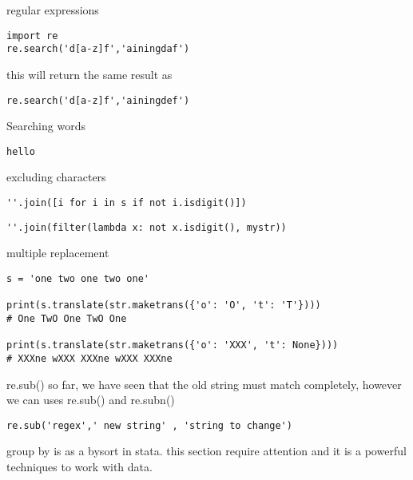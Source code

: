 \documentclass{beamer}
\begin{document}
\begin{frame}[fragile]{regular expressions}
\begin{lstlisting}
import re
re.search('d[a-z]f','ainingdaf')
\end{lstlisting}
this will return the same result as 
\begin{lstlisting}
re.search('d[a-z]f','ainingdef')
\end{lstlisting}
\end{frame}

\begin{frame}[fragile]{Searching words}
\begin{lstlisting}
hello
\end{lstlisting}
\end{frame}


\begin{frame}[fragile]{excluding characters}
\begin{lstlisting}
''.join([i for i in s if not i.isdigit()])
\end{lstlisting}

\begin{lstlisting}
''.join(filter(lambda x: not x.isdigit(), mystr))
\end{lstlisting}

\end{frame}


\begin{frame}[fragile]{multiple replacement}
\begin{lstlisting}
s = 'one two one two one'

print(s.translate(str.maketrans({'o': 'O', 't': 'T'})))
# One TwO One TwO One

print(s.translate(str.maketrans({'o': 'XXX', 't': None})))
# XXXne wXXX XXXne wXXX XXXne
\end{lstlisting}
\end{frame}



\begin{frame}[fragile]{re.sub()}
so far, we have seen that the old string must match completely, however we can uses re.sub() and re.subn()
\begin{lstlisting}
re.sub('regex',' new string' , 'string to change')
\end{lstlisting}
\end{frame}





\begin{frame}[fragile]{group by}
is as a bysort in stata. this section require attention and it is a powerful techniques to work with data.

\end{frame}
\end{document}
